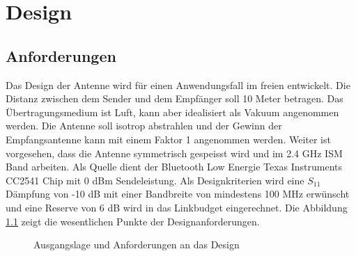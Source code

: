 \newpage 
\chapter{Design}

\section{Anforderungen}
Das Design der Antenne wird für einen Anwendungsfall im freien entwickelt. Die Distanz zwischen dem Sender und dem Empfänger soll 10 Meter betragen. Das Übertragungsmedium ist Luft, kann aber idealisiert als Vakuum angenommen werden. Die Antenne soll isotrop abstrahlen und der Gewinn der Empfangsantenne kann mit einem Faktor  1 angenommen werden. Weiter ist vorgesehen, dass die Antenne symmetrisch gespeisst wird und im 2.4 GHz ISM Band arbeiten. Als Quelle dient der Bluetooth Low Energie Texas Instruments CC2541 Chip mit 0 dBm  Sendeleistung. Als Designkriterien wird eine $S_{11}$ Dämpfung von -10 dB mit einer Bandbreite von mindestens 100 MHz erwünscht und eine Reserve von 6 dB wird in das Linkbudget eingerechnet. Die Abbildung \ref{fig:DesignAusgangslage} zeigt die wesentlichen Punkte der Designanforderungen.

\begin{figure}[!ht]
\begin{center}
\end{center}
\caption{Ausgangslage und Anforderungen an das Design}
\label{fig:DesignAusgangslage}
\end{figure}


